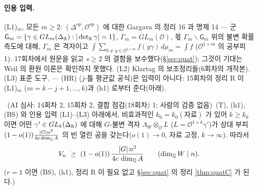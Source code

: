 \paragraph{인용 입력.} (L1)$_m$, 모든 $m\ge2$: $(\Delta^{op},\mathcal O^{op})$ 에 대한 Gargava 의 정리 16 과 명제 14 --- 군 $\mathsf G_m=\{\gamma\in GL_m(\Delta_{\mathbb{R}}):|\det_{\mathbb{R}}\gamma|=1\}$, $\Gamma_m=GL_m(\mathcal O)$, 몫 $\Gamma_m\backslash\mathsf G_m$ 위의 불변 확률측도에 대해, $\Gamma_m$ 은 격자이고 $\int\sum_{0\ne y\in\mathcal O^{1\times m}}f(y\gamma)\,d\mu_m=\int f$ ($\mathcal O^{1\times m}$ 의 공부피 1). 17회차에서 원문을 읽고 $s\ge2$ 의 결함을 보수했다(\S\ref{sec:quat}); 그것이 기대는 Weil 의 환원 이론은 확인하지 못했다. (L2) Klartag 의 보조정리들(6회차의 개작본). (L3) 표준 도구. --- (HR) ($j$-틀 평균값 공식)은 입력이 아니다: 15회차의 정리 R 이 (L1)$_m$ ($m=k-j+1,\dots,k$)과 (h1) 로부터 준다(아래).
\begin{theorem}[틀 정리 E; 비자유 작용 --- 통합 진술]\label{thm:E}\tagPL\ (AI 심사: 14회차 2, 15회차 2, 결합 점검(18회차) 1; 사람의 검증 없음)\
(T), (h1), (BS) 와 인용 입력 (L1)--(L3) 아래에서, 비효과적인 $k_0=k_0(\text{자료})$ 가 있어 $k\ge k_0$ 이면 어떤 $\gamma'\in GL_k(\Delta_{\mathbb{R}})$ 에 대해 $G$-불변 격자 $\Lambda_W\otimes_{\mathcal O}L$ ($L=\mathcal O^{1\times k}\gamma'$)가 상대 부피 $(1-o(1))\tfrac{|G|n^2}{4e\dim_{\mathbb{Q}} A}$ 의 빈 열린 공을 갖는다($o(1)\to0$, 자료 고정, $k\to\infty$). 따라서
\[
V_n\ \ge\ (1-o(1))\,\frac{|G|\,n^2}{4e\,\dim_\Q A}\qquad(\dim_\Q W\mid n).
\]
($r=1$ 이면 (BS), (h1), 정리 R 이 필요 없고 \S\ref{sec:quat} 의 정리 \ref{thm:quatC} 가 된다.)
\end{theorem}
